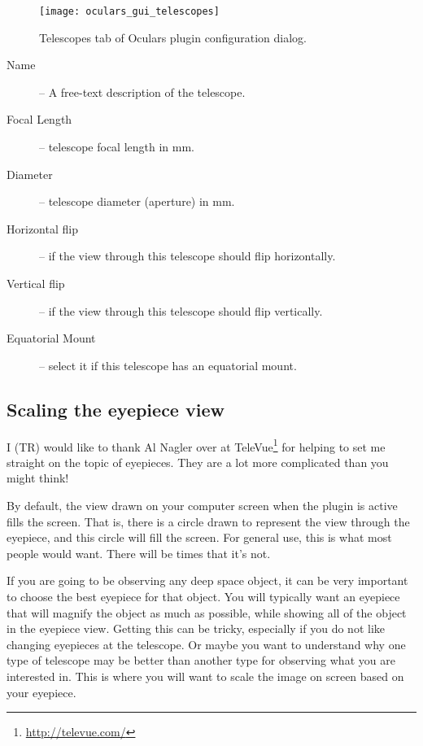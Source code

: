 \begin{figure}[ht]\centering
\texttt{[image: oculars\_gui\_telescopes]}
\caption{Telescopes tab of Oculars plugin configuration dialog.}
\label{fig:plugins:Oculars:Gui:Telescopes}
\end{figure}


\begin{description}
\item[Name] -- A free-text description of the telescope. 
\item[Focal Length] -- telescope focal length in mm.
\item[Diameter] -- telescope diameter (aperture) in mm.
\item[Horizontal flip] -- if the view through this telescope should flip horizontally.
\item[Vertical flip] -- if the view through this telescope should flip vertically.
\item[Equatorial Mount] -- select it if this telescope has an equatorial mount.
\end{description}

\subsection{Scaling the eyepiece view}
\label{sec:sec:plugins:Oculars:ScalingTheEyepieceView}
I (TR) would like to thank Al Nagler over at TeleVue\footnote{\url{http://televue.com/}} for helping to set me straight on the topic of eyepieces. They are a lot more complicated than you might think!

By default, the view drawn on your computer screen when the plugin is active fills the screen. That is, there is a circle drawn to represent the view through the eyepiece, and this circle will fill the screen. For general use, this is what most people would want. There will be times that it's not.

If you are going to be observing any deep space object, it can be very important to choose the best eyepiece for that object. You will typically want an eyepiece that will magnify the object as much as possible, while showing all of the object in the eyepiece view. Getting this can be tricky, especially if you do not like changing eyepieces at the telescope. Or maybe you want to understand why one type of telescope may be better than another type for observing what you are interested in. This is where you will want to scale the image on screen based on your eyepiece.

